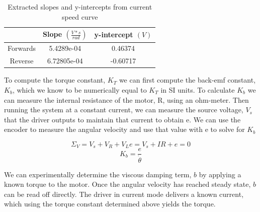 \documentclass{article}
\theoremstyle{plain}
\theoremstyle{definition}
\theoremstyle{remark}
\begin{document}
\begin{table}[htb]
\begin{center}
    \begin{tabular}{|c|c|c|}
        \hline
        ~        & Slope $\left( \frac{V * s}{rad} \right) $ & y-intercept $ \left( V \right) $ \\ \hline
        Forwards & 5.4289e-04                                & 0.46374                          \\ 
        Reverse  & 6.72805e-04                               & -0.60717                         \\
        \hline
    \end{tabular}
\end{center}
\caption{Extracted slopes and y-intercepts from current speed curve}
\label{q2_b5}
\end{table}

To compute the torque constant, $K_{T}$ we can first compute the back-emf constant, $K_b$, which we know to be numerically equal to $K_T$ in SI units.  To calculate $K_b$ we can measure the internal resistance of the motor, R, using an ohm-meter.  Then running the system at a constant current, we can measure the source voltage, $V_{s}$ that the driver outputs to maintain that current  to obtain e. We can use the encoder to measure the angular velocity and use that value with e to solve for $K_b$

$$ \Sigma_{V} = V_{s} + V_{R} + V_{L} e = V_{s} + IR + e = 0 $$
$$ K_b = \frac{e}{\dot{\theta}} $$

%
%

We can experimentally determine the viscous damping term, $b$ by applying a known torque to the motor.  Once the angular velocity has reached steady state, $b$ can be read off directly.  The driver in current mode delivers a known current, which using the torque constant determined above yields the torque.  
\end{document}
